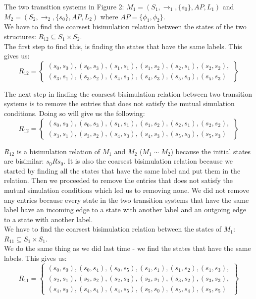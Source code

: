 \documentclass[12pt]{report}
\begin{document}
The two transition systems in Figure 2: $M_1 = (S_1,\rightarrow_1,\{s_0\},AP,L_1)$ and $M_2 = (S_2,\rightarrow_2,\{s_0\},AP,L_2)$ where $AP = \{\phi_1, \phi_2\}$.\\
We have to find the coarsest bisimulation relation between the states of the two structures: $R_{12} \subseteq S_1 \times S_2$.\\
The first step to find this, is finding the states that have the same labels. This gives us:\\
$$R_{12} = \left\{
	\begin{array}{c}
		(s_0, s_0),(s_0, s_3),(s_1,s_1), (s_1,s_2),(s_2,s_1),(s_2,s_2), \\
		(s_3,s_1),(s_3,s_2),(s_4,s_0),(s_4,s_3),(s_5,s_0),(s_5,s_3)
	\end{array}
\right\}$$

The next step in finding the coarsest bisimulation relation between two transition systems is to remove the entries that does not satisfy the mutual simulation conditions. Doing so will give us the following:
$$R_{12} = \left\{
	\begin{array}{c}
		(s_0, s_0),(s_0, s_3),(s_1,s_1), (s_1,s_2),(s_2,s_1),(s_2,s_2), \\
		(s_3,s_1),(s_3,s_2),(s_4,s_0),(s_4,s_3),(s_5,s_0),(s_5,s_3)
	\end{array}
\right\}$$

$R_{12}$ is a bisimulation relation of $M_1$ and $M_2$ ($M_1 \sim M_2$) because the initial states are bisimilar: $s_0 R s_0$. It is also the coarsest bisimulation relation because we started by finding all the states that have the same label and put them in the relation. Then we proceeded to remove the entries that does not satisfy the mutual simulation conditions which led us to removing none. We did not remove any entries because every state in the two transition systems that have the same label have an incoming edge to a state with another label and an outgoing edge to a state with another label.\\
We have to find the coarsest bisimulation relation between the states of $M_1$: $R_{11} \subseteq S_1 \times S_1$.\\
We do the same thing as we did last time - we find the states that have the same labels. This gives us:
$$R_{11} = \left\{
	\begin{array}{c}
		(s_0,s_0),(s_0,s_4),(s_0,s_5),(s_1,s_1),(s_1,s_2),(s_1,s_3), \\
		(s_2,s_1),(s_2,s_2),(s_2,s_3),(s_3,s_1),(s_3,s_2),(s_3,s_3), \\
		(s_4,s_0),(s_4,s_4),(s_4,s_5),(s_5,s_0),(s_5,s_4),(s_5,s_5)
	\end{array}
\right\}$$
\end{document}
